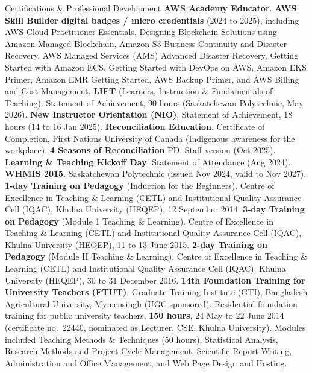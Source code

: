 \begin{rubric}{Certifications \& Professional Development}
\entry*[AWS]%
	\textbf{AWS Academy Educator}. \textbf{AWS Skill Builder digital badges / micro credentials} (2024 to 2025), including AWS Cloud Practitioner Essentials, Designing Blockchain Solutions using Amazon Managed Blockchain, Amazon S3 Business Continuity and Disaster Recovery, AWS Managed Services (AMS) Advanced Disaster Recovery, Getting Started with Amazon ECS, Getting Started with DevOps on AWS, Amazon EKS Primer, Amazon EMR Getting Started, AWS Backup Primer, and AWS Billing and Cost Management.
\vspace{-1mm}
\entry*[Teach]%
	\textbf{LIFT} (Learners, Instruction \& Fundamentals of Teaching). Statement of Achievement, 90 hours (Saskatchewan Polytechnic, May 2026).
	\textbf{New Instructor Orientation (NIO)}. Statement of Achievement, 18 hours (14 to 16 Jan 2025).
	\textbf{Reconciliation Education}. Certificate of Completion, First Nations University of Canada (Indigenous awareness for the workplace).
	\textbf{4 Seasons of Reconciliation} PD. Staff version (Oct 2025).
	\textbf{Learning \& Teaching Kickoff Day}. Statement of Attendance (Aug 2024).
	\textbf{WHMIS 2015}. Saskatchewan Polytechnic (issued Nov 2024, valid to Nov 2027).
\vspace{-1mm}
\entry*[CETL]%
	\textbf{1-day Training on Pedagogy} (Induction for the Beginners). Centre of Excellence in Teaching \& Learning ({CETL}) and Institutional Quality Assurance Cell ({IQAC}), Khulna University (HEQEP), 12 September 2014.
	\textbf{3-day Training on Pedagogy} (Module 1 Teaching \& Learning). Centre of Excellence in Teaching \& Learning ({CETL}) and Institutional Quality Assurance Cell ({IQAC}), Khulna University (HEQEP), 11 to 13 June 2015.
	\textbf{2-day Training on Pedagogy} (Module II Teaching \& Learning). Centre of Excellence in Teaching \& Learning ({CETL}) and Institutional Quality Assurance Cell ({IQAC}), Khulna University (HEQEP), 30 to 31 December 2016.
\vspace{-1mm}
\entry*[GTI]%
	\textbf{14th Foundation Training for University Teachers (FTUT)}. Graduate Training Institute ({GTI}), Bangladesh Agricultural University, Mymensingh (UGC sponsored). Residential foundation training for public university teachers, \textbf{150 hours}, 24 May to 22 June 2014 (certificate no.\ 22440, nominated as Lecturer, CSE, Khulna University). Modules included Teaching Methods \& Techniques (50 hours), Statistical Analysis, Research Methods and Project Cycle Management, Scientific Report Writing, Administration and Office Management, and Web Page Design and Hosting.

\end{rubric}
